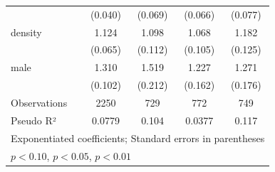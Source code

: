 \begin{table}[htbp]
\begin{tabular}{l*{4}{c}}
            &     (0.040)         &     (0.069)         &     (0.066)         &     (0.077)         \\
\addlinespace
density     &       1.124\sym{**} &       1.098         &       1.068         &       1.182         \\
            &     (0.065)         &     (0.112)         &     (0.105)         &     (0.125)         \\
\addlinespace
male        &       1.310\sym{***}&       1.519\sym{***}&       1.227         &       1.271\sym{*}  \\
            &     (0.102)         &     (0.212)         &     (0.162)         &     (0.176)         \\
\midrule
Observations&        2250         &         729         &         772         &         749         \\
Pseudo R²  &      0.0779         &       0.104         &      0.0377         &       0.117         \\
\bottomrule
\multicolumn{5}{l}{\footnotesize Exponentiated coefficients; Standard errors in parentheses}\\
\multicolumn{5}{l}{\footnotesize \sym{*} \(p<0.10\), \sym{**} \(p<0.05\), \sym{***} \(p<0.01\)}\\
\end{tabular}
\end{table}
